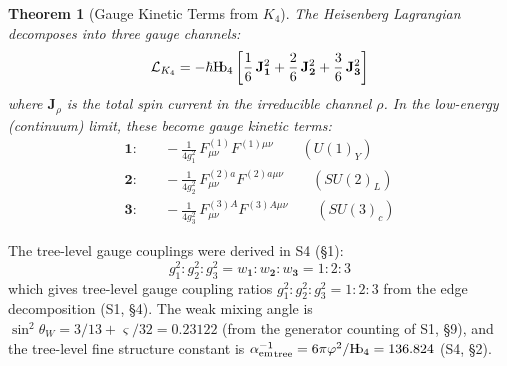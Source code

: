 \documentclass[11pt,a4paper]{article}
\newtheorem{theorem}{Theorem}[section]
\theoremstyle{definition}
\theoremstyle{remark}
\newcommand{\Hb}{\textnormal{H\kern-0.3em b}}
\newcommand{\Hbfour}{\Hb_4}
\newcommand{\strain}{\varsigma}
\newcommand{\gr}{\varphi}
\newcommand{\aem}{\alpha_{\mathrm{em}}}
\newcommand{\tW}{\theta_W}
\newcommand{\LL}{\mathcal{L}}
\begin{document}
\begin{theorem}[Gauge Kinetic Terms from $K_4$]
\label{thm:gauge_kinetic}
The Heisenberg Lagrangian decomposes into three gauge channels:
\begin{equation}
\LL_{K_4} = -\hbar\Hbfour\left[\frac{1}{6}\,\mathbf{J}_{\mathbf{1}}^2 + \frac{2}{6}\,\mathbf{J}_{\mathbf{2}}^2 + \frac{3}{6}\,\mathbf{J}_{\mathbf{3}}^2\right]
\end{equation}
where $\mathbf{J}_\rho$ is the total spin current in the irreducible channel $\rho$. In the low-energy (continuum) limit, these become gauge kinetic terms:
\begin{align}
\mathbf{1}:& \quad -\frac{1}{4g_1^2}\,F_{\mu\nu}^{(1)} F^{(1)\mu\nu} \qquad (U(1)_Y) \label{eq:U1} \\
\mathbf{2}:& \quad -\frac{1}{4g_2^2}\,F_{\mu\nu}^{(2)a} F^{(2)a\mu\nu} \qquad (SU(2)_L) \label{eq:SU2} \\
\mathbf{3}:& \quad -\frac{1}{4g_3^2}\,F_{\mu\nu}^{(3)A} F^{(3)A\mu\nu} \qquad (SU(3)_c) \label{eq:SU3}
\end{align}
\end{theorem}

The tree-level gauge couplings were derived in S4 (\S1):
\begin{equation}
g_1^2 : g_2^2 : g_3^2 = w_{\mathbf{1}} : w_{\mathbf{2}} : w_{\mathbf{3}} = 1 : 2 : 3
\end{equation}
which gives tree-level gauge coupling ratios $g_1^2 : g_2^2 : g_3^2 = 1 : 2 : 3$ from the edge decomposition (S1, \S4). The weak mixing angle is $\sin^2\tW = 3/13 + \strain/32 = 0.23122$ (from the generator counting of S1, \S9), and the tree-level fine structure constant is ${\aem^{-1}}_{\mathrm{tree}} = 6\pi\gr^2/\Hbfour = 136.824$ (S4, \S2).
\end{document}
